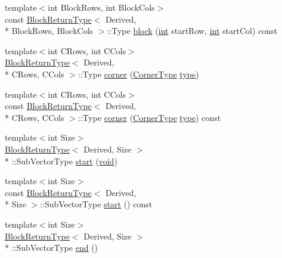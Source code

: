 \begin{DoxyCompactItemize}
\item 
{\footnotesize template$<$int Block\-Rows, int Block\-Cols$>$ }\\const \hyperlink{struct_block_return_type}{Block\-Return\-Type}$<$ Derived, \\*
Block\-Rows, Block\-Cols $>$\-::Type \hyperlink{class_matrix_base_ad982ec2474bdcc4e520590f3232bcbb6}{block} (\hyperlink{ioapi_8h_a787fa3cf048117ba7123753c1e74fcd6}{int} start\-Row, \hyperlink{ioapi_8h_a787fa3cf048117ba7123753c1e74fcd6}{int} start\-Col) const 
\item 
{\footnotesize template$<$int C\-Rows, int C\-Cols$>$ }\\\hyperlink{struct_block_return_type}{Block\-Return\-Type}$<$ Derived, \\*
C\-Rows, C\-Cols $>$\-::Type \hyperlink{class_matrix_base_ac679ab446f8627ee505a1cfc6a004579}{corner} (\hyperlink{_constants_8h_a550469de139cb6f1605cb7cb2bbc79db}{Corner\-Type} \hyperlink{glext_8h_a7d05960f4f1c1b11f3177dc963a45d86}{type})
\item 
{\footnotesize template$<$int C\-Rows, int C\-Cols$>$ }\\const \hyperlink{struct_block_return_type}{Block\-Return\-Type}$<$ Derived, \\*
C\-Rows, C\-Cols $>$\-::Type \hyperlink{class_matrix_base_aa529250526f6c6047a1dba8107b42d13}{corner} (\hyperlink{_constants_8h_a550469de139cb6f1605cb7cb2bbc79db}{Corner\-Type} \hyperlink{glext_8h_a7d05960f4f1c1b11f3177dc963a45d86}{type}) const 
\item 
{\footnotesize template$<$int Size$>$ }\\\hyperlink{struct_block_return_type}{Block\-Return\-Type}$<$ Derived, Size $>$\\*
\-::Sub\-Vector\-Type \hyperlink{class_matrix_base_a7c321dbccb3739f5eff20d466fd67a6a}{start} (\hyperlink{group___u_a_v_objects_plugin_ga444cf2ff3f0ecbe028adce838d373f5c}{void})
\item 
{\footnotesize template$<$int Size$>$ }\\const \hyperlink{struct_block_return_type}{Block\-Return\-Type}$<$ Derived, \\*
Size $>$\-::Sub\-Vector\-Type \hyperlink{class_matrix_base_abbcb8b91b8d6eb7517ecd43bc197d7a1}{start} () const 
\item 
{\footnotesize template$<$int Size$>$ }\\\hyperlink{struct_block_return_type}{Block\-Return\-Type}$<$ Derived, Size $>$\\*
\-::Sub\-Vector\-Type \hyperlink{class_matrix_base_ad8b9c9c883800edea4bb9f2252c2b6a9}{end} ()

\end{DoxyCompactItemize}
